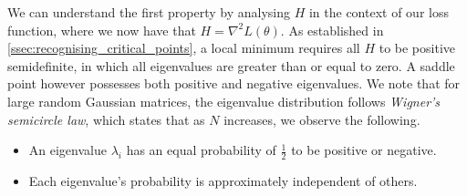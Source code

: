 We can understand the first property by analysing $H$ in the context of our loss function, where we now have that $H = \nabla^2 L(\theta)$. As established in \cref{ssec:recognising_critical_points}, a local minimum requires all $H$ to be positive semidefinite, in which all eigenvalues are greater than or equal to zero. A saddle point however possesses both positive and negative eigenvalues. We note that for large random Gaussian matrices, the eigenvalue distribution follows \textit{Wigner's semicircle law}, which states that as $N$ increases, we observe the following.
\begin{itemize}
    \item An eigenvalue $\lambda_i$ has an equal probability of $\frac{1}{2}$ to be positive or negative. 
    \item Each eigenvalue's probability is approximately independent of others.
\end{itemize}

